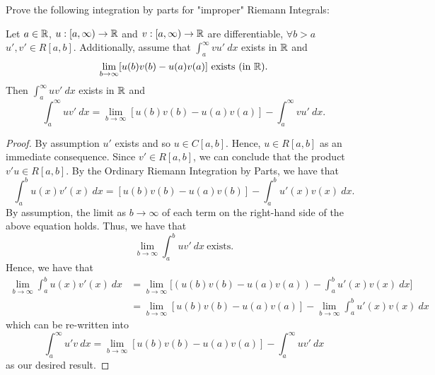 \documentclass[a4paper]{article}
\begin{document}
\begin{problem}
    Prove the following integration by parts for "improper" Riemann Integrals:
\end{problem}
\begin{theorem}
    Let \( a \in \mathbb{R}  \), \( u : [a,\infty) \to \mathbb{R}  \) and \( v : [a,\infty) \to \mathbb{R}  \) are differentiable, \( \forall b > a  \) \( u' , v' \in R[a,b] \). Additionally, assume that \( \int_{ a }^{ \infty  } v u' \ dx  \) exists in \( \mathbb{R}  \) and 
    \[  \lim_{ b \to \infty  } [u(b)v(b) - u(a) v(a)] \ \text{exists} \ (\text{in} \ \R). \]
    Then \( \int_{ a }^{ \infty  } u v' \ dx  \) exists in \( \mathbb{R}  \) and 
    \[  \int_{ a }^{ \infty  } u v' \ dx = \lim_{ b \to \infty }  [u(b)v(b) - u(a)v(a)] - \int_{ a }^{ \infty  }  v u' \ dx. \]
\end{theorem}

\begin{proof}
    By assumption \( u'  \) exists and so \( u \in C[a,b] \). Hence, \( u \in R[a,b] \) as an immediate consequence. Since \( v' \in R[a,b] \), we can conclude that the product \( v' u \in R[a,b] \). By the Ordinary Riemann Integration by Parts, we have that
    \[  \int_{ a }^{ b } u(x) v'(x) \ dx = [u(b)v(b) - u(a)v(b)] - \int_{ a }^{ b } u'(x) v(x) \ dx. \]
    By assumption, the limit as \( b \to \infty   \) of each term on the right-hand side of the above equation holds. Thus, we have that  
    \[  \lim_{ b \to \infty  }  \int_{ a }^{ b } uv' \ dx \ \text{exists}. \]
    Hence, we have that  
    \begin{align*}
       \lim_{ b \to \infty  } \int_{ a }^{ b } u(x) v'(x) \ dx  &= \lim_{ b \to \infty  } \Big[ (u(b)v(b) - u(a)v(a)) - \int_{ a }^{ b } u'(x) v(x) \ dx \Big]  \\
                                                                &= \lim_{ b \to \infty  } [u(b)v(b) - u(a)v(a)] - \lim_{ b \to \infty  }  \int_{ a }^{ b } u'(x) v(x) \ dx \tag{ALT for Functions} 
    \end{align*}
    which can be re-written into
    \[  \int_{ a }^{ \infty  } u' v \ dx = \lim_{ b \to \infty  } [u(b)v(b) - u(a)v(a)] - \int_{ a }^{ \infty  } u v' \ dx  \]
    as our desired result.
\end{proof}
\end{document}
